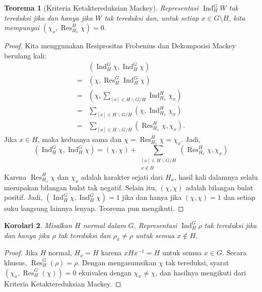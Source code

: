 \documentclass[12pt]{article}
\theoremstyle{plain}
\newtheorem{theorem}{Teorema}[section]
\newtheorem{corollary}[theorem]{Korolari}
\theoremstyle{definition}
\theoremstyle{remark}
\numberwithin{equation}{section}
\begin{document}
\begin{theorem}[Kriteria Ketaktereduksian Mackey]
Representasi $\operatorname{Ind}^G_H W$ tak tereduksi
jika dan hanya jika $W$ tak tereduksi dan,
untuk setiap $x \in G \setminus H$,
kita mempunyai $( \chi_x, \operatorname{Res}^H_{H_x} \chi )=0$.
\end{theorem}

\begin{proof}
Kita menggunakan Resiprositas Frobenius dan Dekomposisi Mackey berulang kali:
\begin{align*}
&( \operatorname{Ind}^G_H \chi, \operatorname{Ind}^G_H \chi )\\
=&( \chi, \operatorname{Res}^G_H \operatorname{Ind}^G_H \chi )\\
=&( \chi, \sum_{[x] \in H\backslash G / H}
\operatorname{Ind}_{H_x}^H \chi_x )\\
=&\sum_{[x] \in H\backslash G / H} ( \chi, 
\operatorname{Ind}_{H_x}^H \chi_x )\\
=&\sum_{[x] \in H\backslash G / H} ( \operatorname{Res}_{H_x}^H\chi, 
 \chi_x ).
\end{align*}
Jika $x \in H$, maka keduanya sama dan
$\chi=\operatorname{Res}_{H_x}^H\chi = \chi_x$.
Jadi,
\[
( \operatorname{Ind}^G_H \chi, \operatorname{Ind}^G_H \chi )
=(\chi,\chi)+
\sum_{\substack{[x] \in H\backslash G / H\\x \not\in  H}}
( \operatorname{Res}_{H_x}^H\chi,  \chi_x )
\]
Karena $\operatorname{Res}_{H_x}^H\chi$ dan $\chi_x$ adalah karakter sejati
dari $H_x$, hasil kali dalamnya selalu merupakan bilangan bulat tak negatif.
Selain itu, $(\chi,\chi)$ adalah bilangan bulat positif.
Jadi,
$( \operatorname{Ind}^G_H \chi, \operatorname{Ind}^G_H \chi )=1$
jika dan hanya jika $(\chi,\chi)=1$ dan setiap suku langsung
lainnya lenyap.
Teorema pun mengikuti.
\end{proof}

\begin{corollary}
Misalkan $H$ normal dalam $G$.
Representasi $\operatorname{Ind}^G_H \rho$ tak tereduksi
jika dan hanya jika $\rho$ tak tereduksi dan $\rho_x \ne \rho$
untuk semua $x \not\in H$.
\end{corollary}

\begin{proof}
Jika $H$ normal, $H_x=H$ karena $xHx^{-1}=H$ untuk semua $x \in G$.
Secara khusus, $\operatorname{Res}^G_H(\rho)=\rho$.
Dengan mengasumsikan $\chi$ tak tereduksi, syarat
$\left(\chi_x,\operatorname{Res}^G_H(\chi)\right)=0$
ekuivalen dengan $\chi_x \ne \chi$, dan hasilnya mengikuti dari
Kriteria Ketaktereduksian Mackey.
\end{proof}
\end{document}
